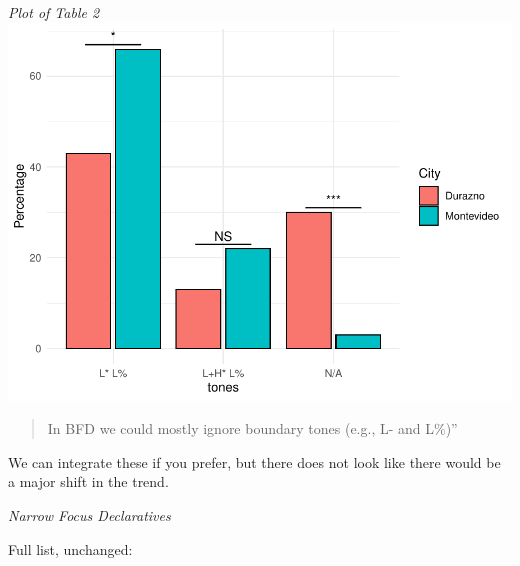 \documentclass[
  man]{apa6}
\begin{document}
\emph{Plot of Table 2}
\includegraphics{main_files/figure-latex/unnamed-chunk-5-1.pdf}

\begin{quote}
In BFD we could mostly ignore boundary tones (e.g., L- and L\%)''
\end{quote}

We can integrate these if you prefer, but there does not look like there would be a major shift in the trend.

\emph{Narrow Focus Declaratives}

Full list, unchanged:
\end{document}
